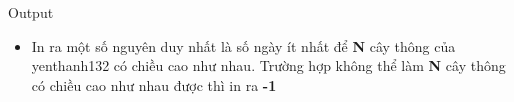 Output
\begin{itemize}
	\item In ra một số nguyên duy nhất là số ngày ít nhất để \textbf{ N } cây thông của yenthanh132 có chiều cao như nhau. Trường hợp không thể làm \textbf{ N } cây thông có chiều cao như nhau được thì in ra \textbf{ -1 }
\end{itemize}